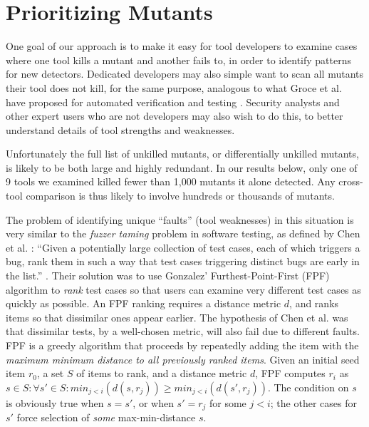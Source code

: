 \section{Prioritizing Mutants}
\label{sec:prioritizing}

One goal of our approach is to make it easy for tool developers to
examine cases where one tool kills a mutant and another fails to, in
order to identify patterns for new detectors.  Dedicated developers may also
simple want to scan all mutants their tool does not kill, for the same
purpose, analogous to what Groce et al. have proposed for automated
verification and testing \cite{groce2015verified,groce2018verified}.
Security analysts and other expert users who are not developers may
also wish to do this, to better understand details of tool strengths
and weaknesses.

Unfortunately the full list of unkilled mutants, or differentially
unkilled mutants, is likely to be both large and highly redundant.  In
our results below, only one of 9 tools we examined killed fewer than
1,000 mutants it alone detected.  Any cross-tool comparison is thus
likely to involve hundreds or thousands of mutants.

The problem of identifying unique ``faults'' (tool weaknesses) in this
situation is very similar to the \emph{fuzzer taming} problem in
software testing, as defined by Chen et al. \cite{PLDI13}: ``Given a
potentially large collection of test cases, each of which triggers a
bug, rank them in such a way that test cases triggering distinct bugs
are early in the list.'' \cite{PLDI13}.  Their solution was
to use Gonzalez' Furthest-Point-First \cite{Gonzalez} (FPF) algorithm
to \emph{rank} test cases so that users can examine very different
test cases as quickly as possible.  An
FPF ranking requires a distance metric $d$, and ranks items so that
dissimilar ones appear earlier.
The hypothesis of Chen et al. was that dissimilar tests, by a
well-chosen metric, will also fail due to different faults.  FPF is a
greedy algorithm that proceeds by repeatedly adding the item with the
\emph{maximum minimum distance to all previously ranked items}. Given an
initial seed item $r_0$, a set $S$ of items to rank, and a distance
metric $d$, FPF computes $r_i$ as
$s \in S: \forall s' \in S: min_{ j < i}(d(s,r_j)) \geq min_{j <
  i}(d(s',r_j))$.  The condition on $s$ is obviously true when
$s = s'$, or when $s' = r_j$ for some $j < i$; the other cases for
$s'$ force selection of \emph{some}
max-min-distance $s$.

